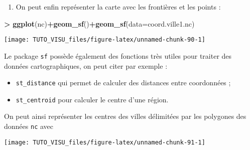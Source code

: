 \documentclass[]{article}
\newenvironment{Shaded}{\begin{snugshade}}{\end{snugshade}}
\newcommand{\DataTypeTok}[1]{\textcolor[rgb]{0.13,0.29,0.53}{#1}}
\newcommand{\KeywordTok}[1]{\textcolor[rgb]{0.13,0.29,0.53}{\textbf{#1}}}
\newcommand{\NormalTok}[1]{#1}
\newcommand{\OperatorTok}[1]{\textcolor[rgb]{0.81,0.36,0.00}{\textbf{#1}}}
\newcommand{\StringTok}[1]{\textcolor[rgb]{0.31,0.60,0.02}{#1}}
\providecommand{\tightlist}{%
  \setlength{\itemsep}{0pt}\setlength{\parskip}{0pt}}
\theoremstyle{definition}
\theoremstyle{definition}
\theoremstyle{definition}
\theoremstyle{remark}
\begin{document}
\begin{enumerate}
\def\labelenumi{\arabic{enumi}.}
\setcounter{enumi}{3}
\tightlist
\item
  On peut enfin représenter la carte avec les frontières et les points :
\end{enumerate}

\begin{Shaded}
\begin{Highlighting}[]
\OperatorTok{>}\StringTok{ }\KeywordTok{ggplot}\NormalTok{(nc)}\OperatorTok{+}\KeywordTok{geom_sf}\NormalTok{()}\OperatorTok{+}\KeywordTok{geom_sf}\NormalTok{(}\DataTypeTok{data=}\NormalTok{coord.ville1.nc)}
\end{Highlighting}
\end{Shaded}

\begin{center}\texttt{[image: TUTO\_VISU\_files/figure-latex/unnamed-chunk-90-1]} \end{center}

Le package \texttt{sf} possède également des fonctions très utiles pour traiter des données cartographiques, on peut citer par exemple :

\begin{itemize}
\tightlist
\item
  \texttt{st\_distance} qui permet de calculer des distances entre coordonnées ;
\item
  \texttt{st\_centroid} pour calculer le centre d'une région.
\end{itemize}

On peut ainsi représenter les centres des villes délimitées par les polygones des données \texttt{nc} avec

\begin{Shaded}
\end{Shaded}

\begin{center}\texttt{[image: TUTO\_VISU\_files/figure-latex/unnamed-chunk-91-1]} \end{center}
\end{document}
